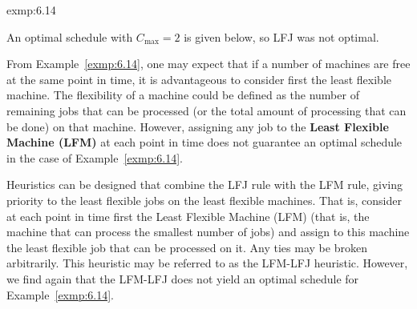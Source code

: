 \begin{exmp}{exmp:6.14}
\begin{center}
\begin{tikzpicture}[/pgfgantt/y unit chart=0.7cm]
        \end{tikzpicture}
    \end{center}
    \vspace{-0.4cm}
    An optimal schedule with $C_{\max} = 2$ is given below, so LFJ was not optimal. 
    \begin{center} 
    \end{center}
\end{exmp}

From Example~\ref{exmp:6.14}, one may expect that if a number of machines are 
free at the same point in time, it is advantageous to consider first the least 
flexible machine. The flexibility of a machine could be defined as the number 
of remaining jobs that can be processed (or the total amount of processing that 
can be done) on that machine. However, assigning any job to the {\bf Least 
Flexible Machine (LFM)} at each point in time does not guarantee an optimal
schedule in the case of Example~\ref{exmp:6.14}.

Heuristics can be designed that combine the LFJ rule with the LFM rule,
giving priority to the least flexible jobs on the least flexible machines. That is,
consider at each point in time first the Least Flexible Machine (LFM) (that is,
the machine that can process the smallest number of jobs) and assign to this
machine the least flexible job that can be processed on it. Any ties may be
broken arbitrarily. This heuristic may be referred to as the LFM-LFJ heuristic.
However, we find again that the LFM-LFJ does not yield an optimal schedule for 
Example~\ref{exmp:6.14}.


